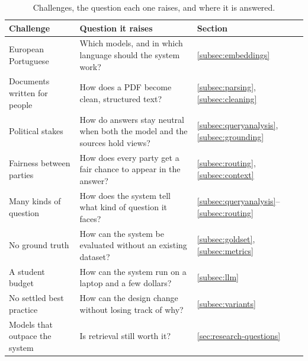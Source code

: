 \begin{table}[htbp]
    \centering
    \small
    \begin{tabular}{|p{}|p{}|p{}|}
        \hline
        \textbf{Challenge} & \textbf{Question it raises} & \textbf{Section} \\
        \hline
        European Portuguese & Which models, and in which language should the system work? & \ref{subsec:embeddings} \\
        Documents written for people & How does a PDF become clean, structured text? & \ref{subsec:parsing}, \ref{subsec:cleaning} \\
        Political stakes & How do answers stay neutral when both the model and the sources hold views? & \ref{subsec:queryanalysis}, \ref{subsec:grounding} \\
        Fairness between parties & How does every party get a fair chance to appear in the answer? & \ref{subsec:routing}, \ref{subsec:context} \\
        Many kinds of question & How does the system tell what kind of question it faces? & \ref{subsec:queryanalysis}--\ref{subsec:routing} \\
        No ground truth & How can the system be evaluated without an existing dataset? & \ref{subsec:goldset}, \ref{subsec:metrics} \\
        A student budget & How can the system run on a laptop and a few dollars? & \ref{subsec:llm} \\
        No settled best practice & How can the design change without losing track of why? & \ref{subsec:variants} \\
        Models that outpace the system & Is retrieval still worth it? & \ref{sec:research-questions} \\
        \hline
    \end{tabular}
    \caption[Challenges and where they are answered]{Challenges, the question each one raises, and where it is
    answered.}
    \label{tab:challenges}
\end{table}
